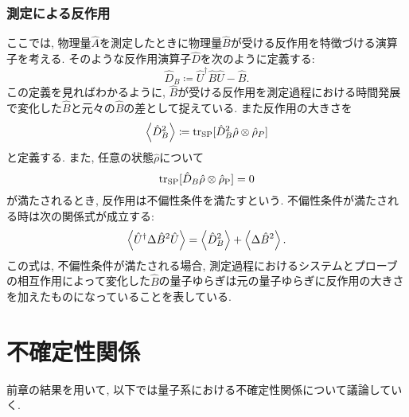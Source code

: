 \subsubsection{測定による反作用}
ここでは, 物理量\(\hat{A}\)を測定したときに物理量\(\hat{B}\)が受ける反作用を特徴づける演算子を考える. そのような反作用演算子\(\hat{D}\)を次のように定義する:
\begin{equation}
    \hat{D}_B\coloneqq\hat{U}^\dag\hat{B}\hat{U}-\hat{B}.
\end{equation}
この定義を見ればわかるように, \(\hat{B}\)が受ける反作用を測定過程における時間発展で変化した\(\hat{B}\)と元々の\(\hat{B}\)の差として捉えている. また反作用の大きさを
\begin{equation}
  \ev{\hat{D}_B^2}\coloneqq\tr_{\si{SP}}[\hat{D}_B^2\hat{\rho}\otimes\hat{\rho}_P]
\end{equation}
と定義する. また, 任意の状態\(\hat{\rho}\)について
\begin{equation}
  \tr_{\si{SP}}[\hat{D}_B\hat{\rho}\otimes\hat{\rho}_{\si{P}}]=0
\end{equation}
が満たされるとき, 反作用は不偏性条件を満たすという. 不偏性条件が満たされる時は次の関係式が成立する:
\begin{equation}
    \ev{\hat{U}^\dag\Delta\hat{B}^2\hat{U}}=\ev{\hat{D}^2_B}+\ev{\Delta\hat{B}^2}.
\end{equation}
この式は, 不偏性条件が満たされる場合, 測定過程におけるシステムとプローブの相互作用によって変化した\(\hat{B}\)の量子ゆらぎは元の量子ゆらぎに反作用の大きさを加えたものになっていることを表している. 

\section{不確定性関係}
前章の結果を用いて, 以下では量子系における不確定性関係について議論していく. 
